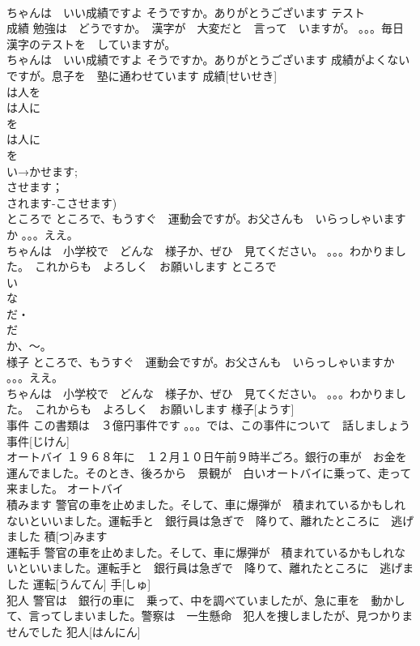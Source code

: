 \documentclass[8pt]{extreport}
\begin{document}
\begin{CJK}{UTF8}{min}
\\	ちゃんは　いい成績ですよ そうですか。ありがとうございます	テスト			
\\	成績	勉強は　どうですか。　漢字が　大変だと　言って　いますが。 。。。毎日　漢字のテストを　していますが。
\\	ちゃんは　いい成績ですよ そうですか。ありがとうございます 成績がよくないですが。息子を　塾に通わせています	成績[せいせき]			
\\	は人を
\\	は人に
\\	を
\\	は人に
\\	を
\\	い→かせます;
\\	させます；
\\	されます-こさせます)
\\	ところで	ところで、もうすぐ　運動会ですが。お父さんも　いらっしゃいますか 。。。ええ。 
\\	ちゃんは　小学校で　どんな　様子か、ぜひ　見てください。 。。。わかりました。　これからも　よろしく　お願いします	ところで			
\\	い　
\\	な
\\	だ・
\\	だ 
\\	か、～。
\\	様子	ところで、もうすぐ　運動会ですが。お父さんも　いらっしゃいますか 。。。ええ。 
\\	ちゃんは　小学校で　どんな　様子か、ぜひ　見てください。 。。。わかりました。　これからも　よろしく　お願いします	様子[ようす]			
\\	事件	この書類は　３億円事件です 。。。では、この事件について　話しましょう	事件[じけん]					
\\	オートバイ	１９６８年に　１２月１０日午前９時半ごろ。銀行の車が　お金を　運んでました。そのとき、後ろから　景観が　白いオートバイに乗って、走って来ました。	オートバイ						
\\	積みます	警官の車を止めました。そして、車に爆弾が　積まれているかもしれないといいました。運転手と　銀行員は急ぎで　降りて、離れたところに　逃げました	積[つ]みます			
\\	運転手	警官の車を止めました。そして、車に爆弾が　積まれているかもしれないといいました。運転手と　銀行員は急ぎで　降りて、離れたところに　逃げました	運転[うんてん] 手[しゅ]			
\\	犯人	警官は　銀行の車に　乗って、中を調べていましたが、急に車を　動かして、言ってしまいました。警察は　一生懸命　犯人を捜しましたが、見つかりませんでした	犯人[はんにん]			

\end{CJK}
\end{document}
